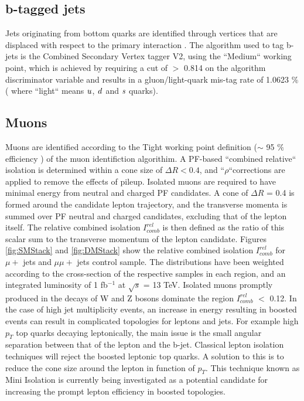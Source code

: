 \subsection{b-tagged jets}
\label{sec:btags}
Jets originating from bottom quarks are identified through vertices that are displaced with respect to the primary interaction \cite{b-tagging}. The algorithm used to tag b-jets is the Combined Secondary Vertex tagger V2, using the ``Medium`` working point, which is achieved by requiring a cut of $>$ 0.814 on the algorithm discriminator variable and results in a gluon/light-quark mis-tag rate of 1.0623 $\%$ ( where ``light`` means $\it{u}$, $\it{d}$ and $\it{s}$ quarks).



\subsection{Muons}
\label{sec:muon-id}
Muons are identified according to the Tight working point definition ($\sim$ 95 $\%$ efficiency ) of the muon identifiction algorithim. A PF-based ``combined relative`` isolation is determined within a cone size of $\Delta R < 0.4 $, and ``$\rho$``corrections are applied to remove the effects of pileup. Isolated muons are required to have minimal energy from neutral and charged PF candidates. A cone of $\Delta R$ = 0.4 is formed around the candidate lepton trajectory, and the transverse momenta is summed over PF neutral and charged candidates, excluding that of the lepton itself. The relative combined isolation $I^{rel}_{comb}$ is then defined as the ratio of this scalar sum to the transverse momentum of the lepton candidate. 
Figures \ref{fig:SMStack} and \ref{fig:DMStack} show the relative combined isolation $I^{rel}_{comb}$ for $\mu +$ jets and $\mu\mu +$ jets control sample. The distributions have been weighted according to the cross-section of the respective samples in each region, and an integrated luminosity of 1 fb$^{-1}$ at $\sqrt{s}$ = 13 TeV. Isolated muons promptly produced in the decays of W and Z bosons dominate the region $I^{rel}_{comb}$ $<$ 0.12.
In the case of high jet multiplicity events, an increase in energy resulting in boosted events can result in complicated topologies for leptons and jets. For example high $p_{T}$ top quarks decaying leptonically, the main issue is the small angular separation between that of the lepton and the b-jet. Classical lepton isolation techniques will reject the boosted leptonic top quarks. A solution to this is to reduce the cone size around the lepton in function of $p_{T}$. This technique known as Mini Isolation is currently being investigated as a potential candidate for increasing the prompt lepton efficiency in boosted topologies.  

